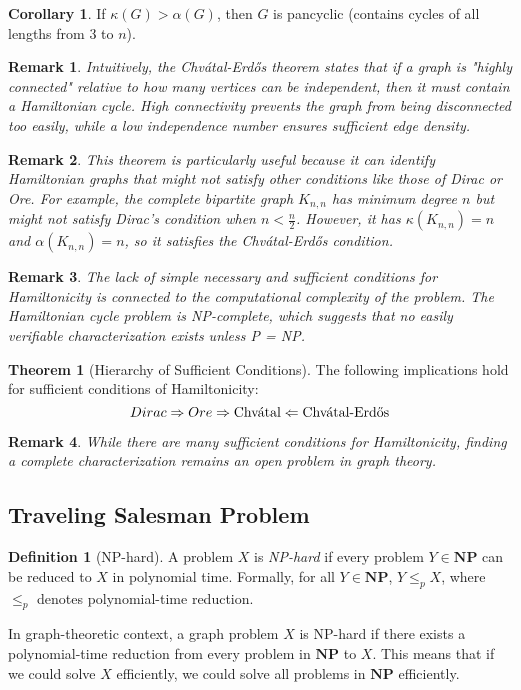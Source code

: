 \documentclass{article}
\newtheorem{remark}{Remark}
\theoremstyle{definition}
\newtheorem{theorem}{Theorem}
\newtheorem{corollary}{Corollary}
\newtheorem{definition}{Definition}
\begin{document}
\begin{corollary}
If $\kappa(G) > \alpha(G)$, then $G$ is pancyclic (contains cycles of all lengths from 3 to $n$).
\end{corollary}

\begin{remark}
Intuitively, the Chvátal-Erdős theorem states that if a graph is "highly connected" relative to how many vertices can be independent, then it must contain a Hamiltonian cycle. High connectivity prevents the graph from being disconnected too easily, while a low independence number ensures sufficient edge density.
\end{remark}

\begin{remark}
This theorem is particularly useful because it can identify Hamiltonian graphs that might not satisfy other conditions like those of Dirac or Ore. For example, the complete bipartite graph $K_{n,n}$ has minimum degree $n$ but might not satisfy Dirac's condition when $n < \frac{n}{2}$. However, it has $\kappa(K_{n,n}) = n$ and $\alpha(K_{n,n}) = n$, so it satisfies the Chvátal-Erdős condition.
\end{remark}

\begin{remark}
The lack of simple necessary and sufficient conditions for Hamiltonicity is connected to the computational complexity of the problem. The Hamiltonian cycle problem is NP-complete, which suggests that no easily verifiable characterization exists unless P = NP.
\end{remark}

\begin{theorem}[Hierarchy of Sufficient Conditions]
The following implications hold for sufficient conditions of Hamiltonicity:
\[Dirac \Rightarrow Ore \Rightarrow \text{Chv\'{a}tal} \Leftarrow \text{Chv\'{a}tal-Erd\H{o}s}\]
\end{theorem}

\begin{remark}
While there are many sufficient conditions for Hamiltonicity, finding a complete characterization remains an open problem in graph theory.
\end{remark}

\subsection{Traveling Salesman Problem}

\begin{definition}[NP-hard]
A problem $X$ is \emph{NP-hard} if every problem $Y \in \mathbf{NP}$ can be reduced to $X$ in polynomial time. Formally, for all $Y \in \mathbf{NP}$, $Y \leq_p X$, where $\leq_p$ denotes polynomial-time reduction.

In graph-theoretic context, a graph problem $X$ is NP-hard if there exists a polynomial-time reduction from every problem in $\mathbf{NP}$ to $X$. This means that if we could solve $X$ efficiently, we could solve all problems in $\mathbf{NP}$ efficiently.
\end{definition}
\end{document}
